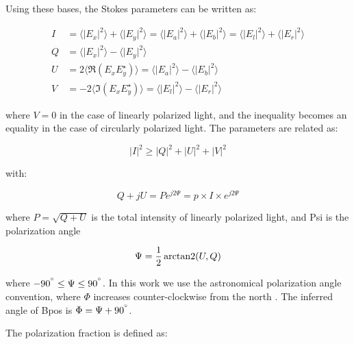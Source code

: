 Using these bases, the Stokes parameters can be written as:

\begin{equation}
  \begin{split}
  I &= \langle \lvert E_{x} \rvert ^{2} \rangle + \langle \lvert E_{y} \rvert ^{2} \rangle = \langle \lvert E_{a} \rvert ^{2} \rangle + \langle \lvert E_{b} \rvert ^{2} \rangle = \langle \lvert E_{l} \rvert ^{2} \rangle + \langle \lvert E_{r} \rvert ^{2} \rangle \\
  Q &= \langle \lvert E_{x} \rvert ^{2} \rangle - \langle \lvert E_{y} \rvert ^{2} \rangle \\
  U &= 2\langle \Re \left( E_{x}E_{y}^{\star} \right) \rangle = \langle \lvert E_{a} \rvert ^{2} \rangle - \langle \lvert E_{b} \rvert ^{2} \rangle \\
  V &= -2\langle \Im \left( E_{x}E_{y}^{\star} \right) \rangle = \langle \lvert E_{l} \rvert ^{2} \rangle - \langle \lvert E_{r} \rvert ^{2} \rangle
  \end{split}
\end{equation}

where $V = 0$ in the case of linearly polarized light, and the inequality becomes an equality in the case of circularly polarized light. The parameters are related as:

\begin{equation}
  \lvert I \rvert ^{2} \geq \lvert Q \rvert ^{2} + \lvert U \rvert ^{2} + \lvert V \rvert ^{2}
\end{equation}

with:

\begin{equation}
  Q + jU = Pe^{j2\Psi} = p \times I \times e^{j2\Psi}
\end{equation}

where $P = \sqrt{Q + U}$ is the total intensity of linearly polarized light, and \gls{Psi} is the polarization angle

\begin{equation}\label{eq:pol angle}
  \Psi = \frac{1}{2} \operatorname{arctan2}(U, Q)
\end{equation}

where $-90^{\degree} \leq \Psi \leq 90^{\degree}$. In this work we use the astronomical polarization angle convention, where $\Phi$ increases counter-clockwise from the north \citep{shariff2015polarimetry}. The inferred angle of \gls{Bpos} is $\Phi = \Psi + 90^{\degree}$.

The polarization fraction is defined as:

